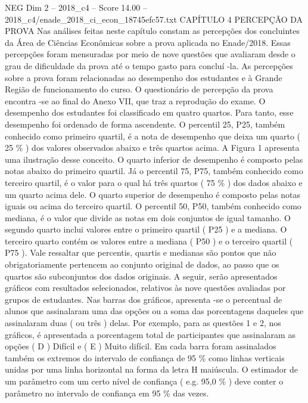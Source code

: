 \begin{textsample}{NEG Dim 2 – 2018\_c4 – Score 14.00 – 2018\_c4/enade\_2018\_ci\_econ\_18745efc57.txt}  \label{ex:f2_neg_378}
CAPÍTULO 4 PERCEPÇÃO DA PROVA Nas análises feitas neste capítulo constam as percepções dos concluintes da Área de Ciências Econômicas sobre a prova aplicada no Enade/2018.
Essas percepções foram mensuradas por meio de nove questões que avaliaram desde o grau de dificuldade da prova até o tempo gasto para concluí -la.
As percepções sobre a prova foram relacionadas ao desempenho dos estudantes e à Grande Região de funcionamento do curso.
O questionário de percepção da prova encontra -se ao final do Anexo VII, que traz a reprodução do exame.
O desempenho dos estudantes foi classificado em quatro quartos.
Para tanto, esse desempenho foi ordenado de forma ascendente.
O percentil 25, P25, também conhecido como primeiro quartil, é a nota de desempenho que deixa um quarto ( 25 \% ) dos valores observados abaixo e três quartos acima.
A Figura 1 apresenta uma ilustração desse conceito.
O quarto inferior de desempenho é composto pelas notas abaixo do primeiro quartil.
Já o percentil 75, P75, também conhecido como terceiro quartil, é o valor para o qual há três quartos ( 75 \% ) dos dados abaixo e um quarto acima dele.
O quarto superior de desempenho é composto pelas notas iguais ou acima do terceiro quartil.
O percentil 50, P50, também conhecido como mediana, é o valor que divide as notas em dois conjuntos de igual tamanho.
O segundo quarto inclui valores entre o primeiro quartil ( P25 ) e a mediana.
O terceiro quarto contém os valores entre a mediana ( P50 ) e o terceiro quartil ( P75 ).
Vale ressaltar que percentis, quartis e medianas são pontos que não obrigatoriamente pertencem ao conjunto original de dados, ao passo que os quartos são subconjuntos dos dados originais.
A seguir, serão apresentados gráficos com resultados selecionados, relativos às nove questões avaliadas por grupos de estudantes.
Nas barras dos gráficos, apresenta -se o percentual de alunos que assinalaram uma das opções ou a soma das porcentagens daqueles que assinalaram duas ( ou três ) delas.
Por exemplo, para as questões 1 e 2, nos gráficos, é apresentada a porcentagem total de participantes que assinalaram as opções ( D ) Difícil e ( E ) Muito difícil.
Em cada barra foram assinalados também os extremos do intervalo de confiança de 95 \% como linhas verticais unidas por uma linha horizontal na forma da letra H maiúscula.
O estimador de um parâmetro com um certo nível de confiança ( e.g. 95,0 \% ) deve conter o parâmetro no intervalo de confiança em 95 \% das vezes.

\end{textsample}
